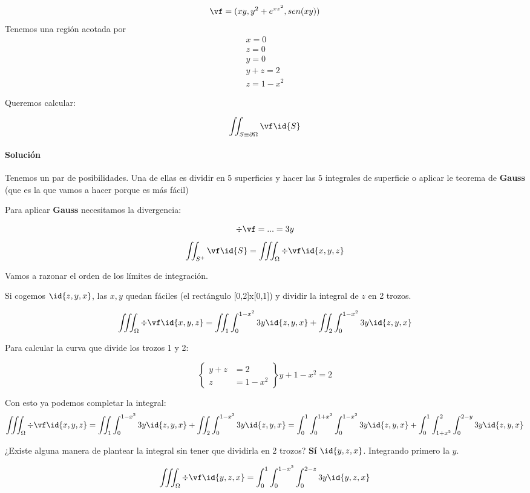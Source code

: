 \begin{example}
\[\vf = (xy,y^2+e^{xz^2},sen(xy))\]
Tenemos una región acotada por 
\begin{gather*}
x=0\\
z=0\\
y=0\\
y+z=2\\
z=1-x^2
\end{gather*}

Queremos calcular:

\[\iint_{S\equiv\partial \Omega} \vf \id{S}\]


\paragraph{Solución}

Tenemos un par de posibilidades. Una de ellas es dividir en 5 superficies y hacer las 5 integrales de superficie o aplicar le teorema de \textbf{Gauss} (que es la que vamos a hacer porque es más fácil)

Para aplicar \textbf{Gauss} necesitamos la divergencia:

\[\div\vf = ... = 3y\]
\[
\iint_{S^+} \vf \id{S} = \iiint_{\Omega} \div\vf \id{x,y,z}
\]

Vamos a razonar el orden de los límites de integración.

Si cogemos $\id{z,y,x}$, las $x,y$ quedan fáciles (el rectángulo [0,2]x[0,1]) y dividir la integral de $z$ en 2 trozos.

\[
\iiint_{\Omega} \div\vf \id{x,y,z} = \iint_{1} \int_0^{1-x^2} 3y\id{z,y,x} + \iint_{2} \int_0^{1-x^2} 3y\id{z,y,x}
\]

Para calcular la curva que divide los trozos 1 y 2:

\[\left\{\begin{array}{cc}
y+z&=2\\
z&=1-x^2
\end{array} \right\} y+1-x^2=2\]

Con esto ya podemos completar la integral:
\[
\iiint_{\Omega} \div\vf \id{x,y,z} = \iint_{1} \int_0^{1-x^2} 3y\id{z,y,x} + \iint_{2} \int_0^{1-x^2} 3y\id{z,y,x} = \int_0^1\int_0^{1+x^2}\int_0^{1-x^2}3y\id{z,y,x}+\int_0^1\int_{1+x^2}^{2}\int_0^{2-y}3y\id{z,y,x}
\]

¿Existe alguna manera de plantear la integral sin tener que dividirla en 2 trozos? \textbf{Sí} $\id{y,z,x}$. Integrando primero la $y$.

\[
\iiint_{\Omega} \div\vf\id{y,z,x} = \int_0^1\int_0^{1-x^2}\int_0^{2-z}3y\id{y,z,x}
\]

\end{example}

